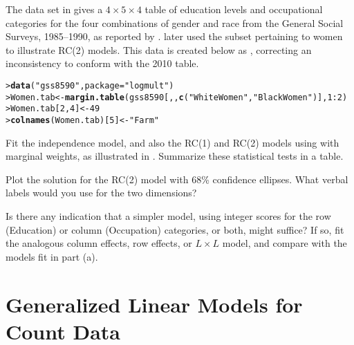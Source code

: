 \documentclass[11pt]{report}\usepackage[]{graphicx}\usepackage[]{color}
\makeatletter
\newcommand{\hlnum}[1]{\textcolor[rgb]{0.686,0.059,0.569}{#1}}%
\newcommand{\hlstr}[1]{\textcolor[rgb]{0.192,0.494,0.8}{#1}}%
\newcommand{\hlopt}[1]{\textcolor[rgb]{0,0,0}{#1}}%
\newcommand{\hlstd}[1]{\textcolor[rgb]{0.345,0.345,0.345}{#1}}%
\newcommand{\hlkwb}[1]{\textcolor[rgb]{0.69,0.353,0.396}{#1}}%
\newcommand{\hlkwc}[1]{\textcolor[rgb]{0.333,0.667,0.333}{#1}}%
\newcommand{\hlkwd}[1]{\textcolor[rgb]{0.737,0.353,0.396}{\textbf{#1}}}%
\newenvironment{kframe}{%
 \def\at@end@of@kframe{}%
 \ifinner\ifhmode%
  \def\at@end@of@kframe{\end{minipage}}%
  \begin{minipage}{\columnwidth}%
 \fi\fi%
 \def\FrameCommand##1{\hskip\@totalleftmargin \hskip-\fboxsep
 \colorbox{shadecolor}{##1}\hskip-\fboxsep
     \hskip-\linewidth \hskip-\@totalleftmargin \hskip\columnwidth}%
 \MakeFramed {\advance\hsize-\width
   \@totalleftmargin\z@ \linewidth\hsize
   \@setminipage}}%
 {\par\unskip\endMakeFramed%
 \at@end@of@kframe}
\newenvironment{knitrout}{}{} %
\renewenvironment{knitrout}{\small\renewcommand{\baselinestretch}{.85}}{} %
\makeatother
\begin{document}
\begin{Exercises}
  
  \exercise The data set  in  gives a $4 \times 5 \times 4$
  table of education levels and occupational categories for the four combinations
  of gender and race from the General Social Surveys, 1985--1990, as reported by
  \citet[Table 2]{Wong:2001}. \citet[Table 2.3B]{Wong:2010} later used the
  subset pertaining to women to illustrate RC(2) models.  This data is
  created below as , correcting an inconsistency to conform with
  the 2010 table.
  

\begin{knitrout}
\color{fgcolor}\begin{kframe}
\begin{alltt}
\hlstd{> }\hlkwd{data}\hlstd{(}\hlstr{"gss8590"}\hlstd{,} \hlkwc{package}\hlstd{=}\hlstr{"logmult"}\hlstd{)}
\hlstd{> }\hlstd{Women.tab} \hlkwb{<-} \hlkwd{margin.table}\hlstd{(gss8590[,,}\hlkwd{c}\hlstd{(}\hlstr{"White Women"}\hlstd{,} \hlstr{"Black Women"}\hlstd{)],} \hlnum{1}\hlopt{:}\hlnum{2}\hlstd{)}
\hlstd{> }\hlstd{Women.tab[}\hlnum{2}\hlstd{,}\hlnum{4}\hlstd{]} \hlkwb{<-} \hlnum{49}
\hlstd{> }\hlkwd{colnames}\hlstd{(Women.tab)[}\hlnum{5}\hlstd{]} \hlkwb{<-} \hlstr{"Farm"}
\end{alltt}
\end{kframe}
\end{knitrout}
  \begin{enumerate*}
    \item Fit the independence model, and also the RC(1) and RC(2) models using
     with marginal weights, as illustrated in .
    Summarize these statistical tests in a table.
    \item Plot the solution for the RC(2) model with 68\% confidence ellipses.
    What verbal labels would you use for the two dimensions?
    \item Is there any indication that a simpler model, using integer scores for
    the row (Education) or column (Occupation) categories, or both, might suffice?
    If so, fit the analogous column effects, row effects, or $L \times L$ model,
    and compare with the models fit in part (a).
  \end{enumerate*}


\end{Exercises}

\chapter{Generalized Linear Models for Count Data}\label{ch:glm}
\end{document}
